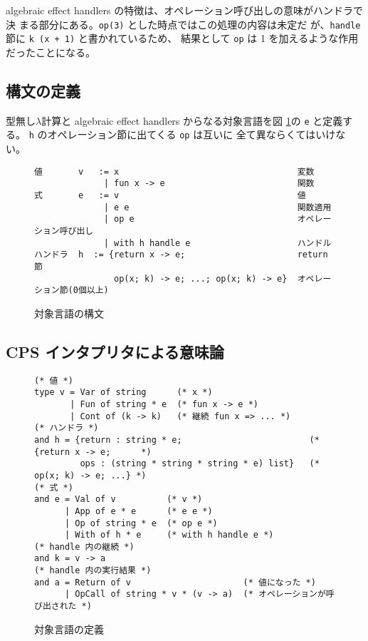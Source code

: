 algebraic effect handlers の特徴は、オペレーション呼び出しの意味がハンドラで決
まる部分にある。\texttt{op(3)} とした時点ではこの処理の内容は未定だ
が、\texttt{handle} 節に \texttt{k (x + 1)} と書かれているため、
結果として \texttt{op} は 1 を加えるような作用だったことになる。

\subsection{構文の定義}
\label{subsection:syntax}
型無し$\lambda$計算と algebraic effect handlers からなる対象言語を図 \ref{figure:abstract_syntax}の \texttt{e} と定義する。
\texttt{h} のオペレーション節に出てくる \texttt{op} は互いに
全て異ならくてはいけない。

\begin{figure}[t]
\begin{spacing}{0.9}
\begin{verbatim}
値　　　  v   := x                                   変数
　　　　       | fun x -> e                          関数
式　　　  e   := v                                   値
　　　　       | e e                                 関数適用
　　　　       | op e                                オペレーション呼び出し
　　　　       | with h handle e                     ハンドル
ハンドラ  h  := {return x -> e;                      return 節
　　　　         op(x; k) -> e; ...; op(x; k) -> e}  オペレーション節(0個以上)
\end{verbatim}
\end{spacing}
\caption{対象言語の構文}
\label{figure:abstract_syntax}
\end{figure}

\subsection{CPS インタプリタによる意味論}
\label{subsection:1cps}

\begin{figure}[t]
\begin{spacing}{0.9}
\begin{verbatim}
(* 値 *)
type v = Var of string      (* x *)
       | Fun of string * e  (* fun x -> e *)
       | Cont of (k -> k)   (* 継続 fun x => ... *)
(* ハンドラ *)
and h = {return : string * e;                         (* {return x -> e;      *)
         ops : (string * string * string * e) list}   (*  op(x; k) -> e; ...} *)
(* 式 *)
and e = Val of v          (* v *)
      | App of e * e      (* e e *)
      | Op of string * e  (* op e *)
      | With of h * e     (* with h handle e *)
(* handle 内の継続 *)
and k = v -> a
(* handle 内の実行結果 *)
and a = Return of v                      (* 値になった *)
      | OpCall of string * v * (v -> a)  (* オペレーションが呼び出された *)
\end{verbatim}
\caption{対象言語の定義}
\label{figure:syntax}
\end{spacing}
\end{figure}

